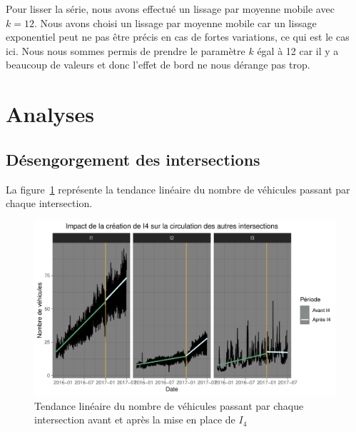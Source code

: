\documentclass[titlepage]{article}
\begin{document}
Pour lisser la série, nous avons effectué un lissage par moyenne mobile
avec $k = 12$. Nous avons choisi un lissage par moyenne mobile car
un lissage exponentiel peut ne pas être précis en cas de fortes
variations, ce qui est le cas ici. Nous nous sommes permis de prendre
le paramètre $k$ égal à 12 car il y a beaucoup de valeurs et donc
l'effet de bord ne nous dérange pas trop.

\newpage
\section{Analyses}
\subsection{Désengorgement des intersections}

La figure~\ref{figure:fig2} représente la tendance linéaire du nombre de véhicules passant par chaque intersection.

\begin{figure}[H]
\centering
\includegraphics[scale=0.55]{vehicule_I4.pdf}
\caption{Tendance linéaire du nombre de véhicules passant par chaque intersection avant et après la mise en place de $I_4$}
\label{figure:fig2}
\end{figure}
\end{document}
